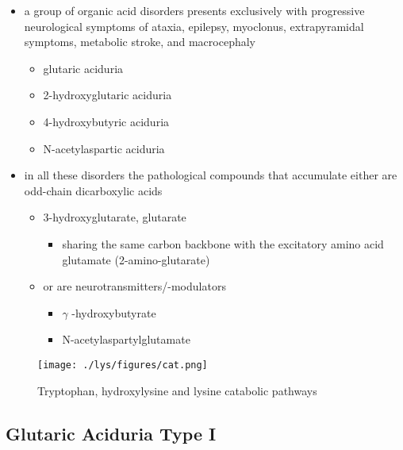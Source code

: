 \documentclass{scrartcl}
\begin{document}
\begin{itemize}
\item a group of organic acid disorders presents exclusively with
progressive neurological symptoms of ataxia, epilepsy, myoclonus,
extrapyramidal symptoms, metabolic stroke, and macrocephaly
\begin{itemize}
\item glutaric aciduria
\item 2-hydroxyglutaric aciduria
\item 4-hydroxybutyric aciduria
\item N-acetylaspartic aciduria
\end{itemize}
\item in all these disorders the pathological compounds that accumulate
either are odd-chain dicarboxylic acids
\begin{itemize}
\item 3-hydroxyglutarate, glutarate
\begin{itemize}
\item sharing the same carbon backbone with the excitatory amino acid
glutamate (2-amino-glutarate)
\end{itemize}
\item or are neurotransmitters/-modulators
\begin{itemize}
\item \(\gamma\) -hydroxybutyrate
\item N-acetylaspartylglutamate
\end{itemize}
\end{itemize}
\end{itemize}

\begin{figure}[htbp]
\centering
\texttt{[image: ./lys/figures/cat.png]}
\caption{\label{fig:org07b59ad}
Tryptophan, hydroxylysine and lysine catabolic pathways}
\end{figure}

\subsection{Glutaric Aciduria Type I}
\label{sec:org01ed756}
\end{document}
